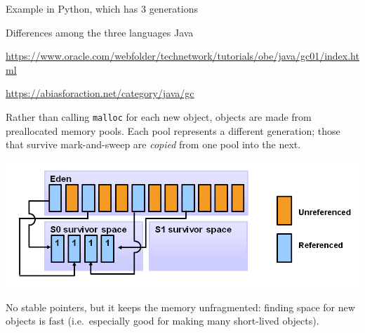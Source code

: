 \documentclass[aspectratio=169]{beamer}
\begin{document}
\begin{frame}[fragile]{Example in Python, which has 3 generations}
\begin{columns}
\begin{uncoverenv}
erenv}
\end{columns}
\end{frame}

\begin{frame}{Differences among the three languages}
\vspace{0.1 cm}
\Huge
Java \hfill {\tiny \begin{minipage}{0.8\linewidth}\hfill \textcolor{blue}{\url{https://www.oracle.com/webfolder/technetwork/tutorials/obe/java/gc01/index.html}}

\hfill \textcolor{blue}{\url{https://abiasforaction.net/category/java/gc}}\end{minipage}}

\vspace{0.25 cm}
\normalsize
Rather than calling \texttt{malloc} for each new object, objects are made from preallocated memory pools. Each pool represents a different generation; those that survive mark-and-sweep are {\it copied} from one pool into the next.

\begin{center}
\includegraphics[width=0.7\linewidth]{java-generations-compactifications.png}
\end{center}

No stable pointers, but it keeps the memory unfragmented: finding space for new objects is fast (i.e.\ especially good for making many short-lived objects).
\end{frame}
\end{document}
